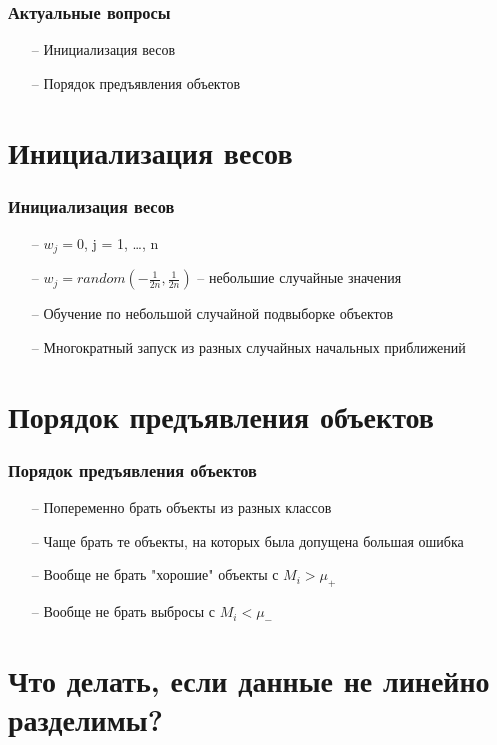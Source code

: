 \documentclass[10pt]{beamer}
\begin{document}
\begin{frame}\frametitle{Актуальные вопросы}
	\begin{itemize} [<+->]
		\item[--] Инициализация весов
		\item[--] Порядок предъявления объектов
	\end{itemize}
\end{frame}

\section{Инициализация весов}

\begin{frame}\frametitle{Инициализация весов}
	\begin{itemize}
		\item[--] $w_j = 0$, j = 1, \dots, n
		\item[--] $w_j = random(-\frac{1}{2n}, \frac{1}{2n})$ -- небольшие случайные значения
		\item[--] Обучение по небольшой случайной подвыборке объектов
		\item[--] Многократный запуск из разных случайных начальных приближений
	\end{itemize}
\end{frame}

\section{Порядок предъявления объектов}

\begin{frame}\frametitle{Порядок предъявления объектов}
	\begin{itemize}
		\item[--] Попеременно брать объекты из разных классов
		\item[--] Чаще брать те объекты, на которых была допущена большая ошибка
		\item[--] Вообще не брать "хорошие" объекты с $M_i > \mu_+$
		\item[--] Вообще не брать выбросы с $M_i < \mu_-$
	\end{itemize}
\end{frame}

\section{Что делать, если данные не линейно разделимы?}
\end{document}
